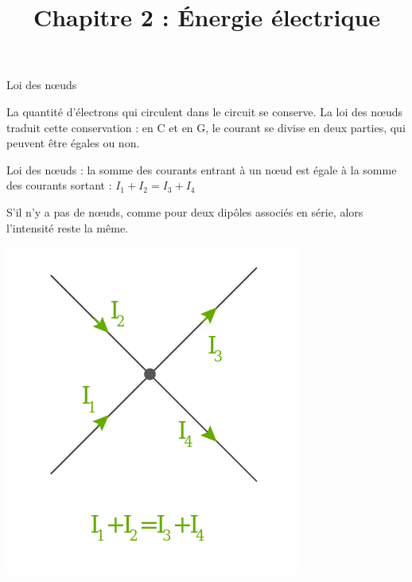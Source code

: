 \documentclass[24pt]{article}
\begin{document}
\date{}
\title{\huge Chapitre 2 : Énergie électrique}
\maketitle %

\programme


\vspace{-10pt}

\begin{concept}{Loi des nœuds}
    \begin{minipage}[c]{0.75\textwidth}
        La quantité d’électrons qui circulent dans le circuit se conserve. La loi des nœuds traduit
        cette conservation : en C et en G, le courant se divise en deux parties, qui peuvent être
        égales ou non.

        Loi des nœuds : la somme des courants entrant à un nœud est égale à la somme des courants sortant :
        $I_1+I_2=I_3+I_4$

        S’il n’y a pas de nœuds, comme pour deux dipôles associés en série, alors l’intensité reste la même.
    \end{minipage}
    \begin{minipage}[c]{0.3\textwidth}
        \begin{center}
            \includegraphics[width=0.5\columnwidth]{noeud.png}
        \end{center}
    \end{minipage}
\end{concept}
\vspace{-20pt}
\end{document}
